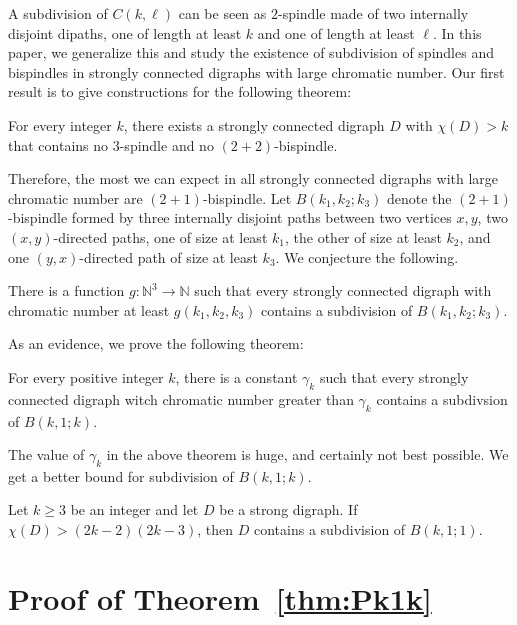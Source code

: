 \documentclass{endm}
\begin{document}
A subdivision of $C(k,\ell)$ can be seen as $2$-spindle made of  two internally disjoint dipaths, one of length at least $k$ and one of length at least $\ell$.
In this paper, we generalize this and study the existence of subdivision of spindles and bispindles in strongly connected digraphs with large chromatic number.
Our first result is to give constructions for the following theorem: 
\begin{theorem}
For every integer $k$, there exists a strongly connected digraph $D$ with $\chi(D) >k$ that contains no $3$-spindle and no $(2+2)$-bispindle. 
\end{theorem}
Therefore, the most we can expect in all strongly connected digraphs with large chromatic number are $(2+1)$-bispindle. Let $B(k_1,k_2;k_3)$ denote the $(2+1)$-bispindle formed by three internally disjoint paths between two vertices $x,y$,
two $(x,y)$-directed paths, one of size at least $k_1$, the other of size at least $k_2$, and one $(y,x)$-directed path of size at least $k_3$.
We conjecture the following.

\begin{conjecture}\label{conj:3chemins}
There is a function $g:\mathbb{N}^3 \rightarrow \mathbb{N}$ such that  every strongly connected digraph with chromatic number at least $g(k_1,k_2,k_3)$ contains
a subdivision of $B(k_1,k_2;k_3)$.
\end{conjecture}

As an evidence, we prove the following theorem:

\begin{theorem}\label{thm:Pk1k}
For every positive integer $k$, there is a constant $\gamma_k$ such that every strongly connected digraph witch chromatic number greater than $\gamma_k$ contains
a subdivsion of $B(k,1;k)$.
\end{theorem}

The value of $\gamma_k$ in the above theorem is huge, and certainly not best possible. We get a better bound for subdivision of $B(k,1;k)$.
\begin{theorem}\label{th:P11k}
Let $k \geq 3$ be an integer and let $D$ be a strong digraph. If $\chi(D) >  (2k-2)(2k-3)$, then $D$ contains a subdivision of $B(k,1;1)$.
\end{theorem}


\section{Proof of Theorem~\ref{thm:Pk1k}}
\end{document}
